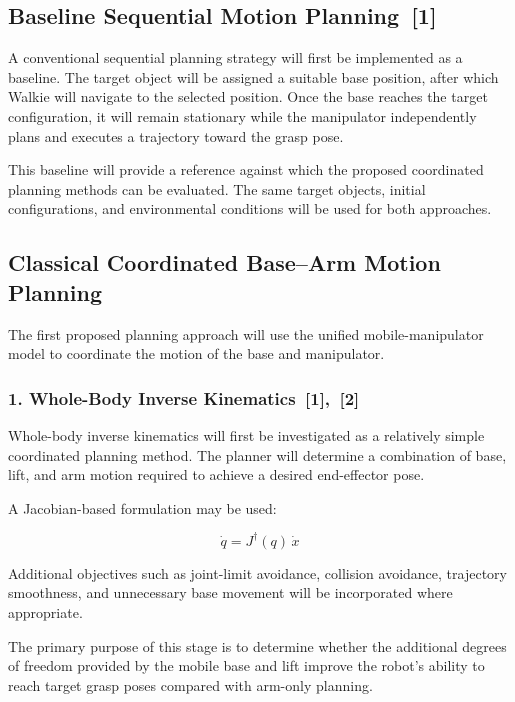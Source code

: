 \documentclass[12pt,a4paper]{article}
\begin{document}
\subsection*{Baseline Sequential Motion Planning~[1]}

A conventional sequential planning strategy will first be implemented as a baseline.
The target object will be assigned a suitable base position, after which Walkie will navigate to
the selected position. Once the base reaches the target configuration, it will remain stationary
while the manipulator independently plans and executes a trajectory toward the grasp pose.

This baseline will provide a reference against which the proposed coordinated planning
methods can be evaluated. The same target objects, initial configurations, and environmental
conditions will be used for both approaches.

\subsection*{Classical Coordinated Base--Arm Motion Planning}

The first proposed planning approach will use the unified mobile-manipulator model to
coordinate the motion of the base and manipulator.

\subsubsection*{1. Whole-Body Inverse Kinematics~[1],~[2]}

Whole-body inverse kinematics will first be investigated as a relatively simple
coordinated planning method. The planner will determine a combination of base, lift, and arm
motion required to achieve a desired end-effector pose.

A Jacobian-based formulation may be used:

\begin{equation}
\dot{q} = J^{\dagger}(q)\,\dot{x}
\end{equation}

Additional objectives such as joint-limit avoidance, collision avoidance, trajectory smoothness,
and unnecessary base movement will be incorporated where appropriate.

The primary purpose of this stage is to determine whether the additional degrees of freedom
provided by the mobile base and lift improve the robot's ability to reach target grasp poses
compared with arm-only planning.
\end{document}

